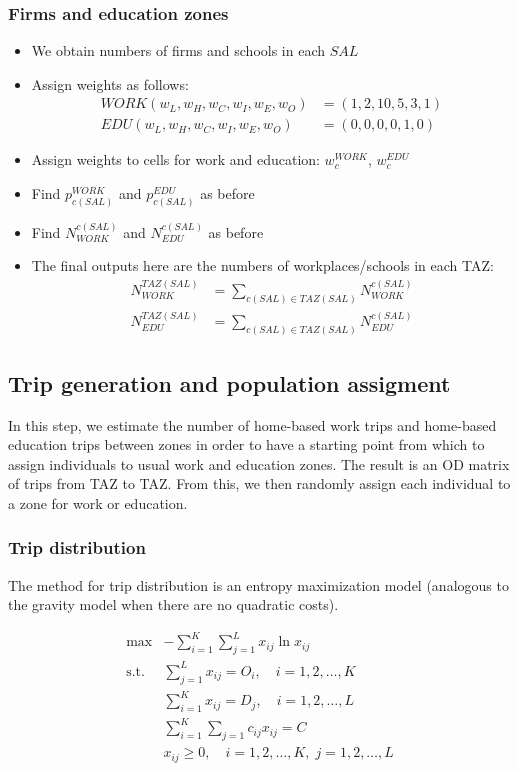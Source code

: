 \documentclass[11pt,twoside]{article}
\numberwithin{equation}{section}
\newcommand{\?}{\stackrel{?}{=}}
\begin{document}
\subsubsection{Firms and education zones}
\begin{itemize}
  \item We obtain numbers of firms and schools in each $SAL$
  \item Assign weights as follows:
    \begin{align}
      WORK (w_L, w_H, w_C, w_I, w_E, w_O) &= (1, 2, 10, 5, 3, 1)\\
      EDU (w_L, w_H, w_C, w_I, w_E, w_O) &= (0, 0, 0, 0, 1, 0)
    \end{align}
  \item Assign weights to cells for work and education: $w_c^{WORK}$,  $w_c^{EDU}$
    
  \item Find $p_{c(SAL)}^{WORK}$ and $p_{c(SAL)}^{EDU}$ as before
  \item Find  $N_{WORK}^{c(SAL)}$ and $ N_{EDU}^{c(SAL)}$ as before
  \item The final outputs here are the numbers of workplaces/schools in each TAZ:
    \begin{align}
      N_{WORK}^{TAZ(SAL)} &= \sum_{c(SAL) \in TAZ(SAL)} N_{WORK}^{c(SAL)} \\
      N_{EDU}^{TAZ(SAL)} &= \sum_{c(SAL) \in TAZ(SAL)} N_{EDU}^{c(SAL)}  
    \end{align}
  \end{itemize}


\subsection{Trip generation and population assigment}
In this step, we estimate the number of home-based work trips and home-based education trips between zones in order to have a starting point from which to assign individuals to usual work and education zones.
The result is an OD matrix of trips from TAZ to TAZ.
From this, we then randomly assign each individual to a zone for work or education.

\subsubsection{Trip distribution}
The method for trip distribution is an entropy maximization model (analogous to the gravity model when there are no quadratic costs).

\begin{align}
  \max & - \sum_{i=1}^K\sum_{j=1}^L x_{ij} \ln x_{ij}\\
  \text{s.t.} & \sum_{j=1}^{L}x_{ij} = O_i, \quad i = 1,2, \dots,K\\
       & \sum_{i=1}^{K}x_{ij} = D_j, \quad i = 1,2, \dots,L\\
       &  \sum_{i=1}^K\sum_{j=1} c_{ij}x_{ij} = C \\
       & x_{ij} \ge 0, \quad i =1,2,\dots,K,\; j  =1,2,\dots,L
\end{align}
\end{document}
